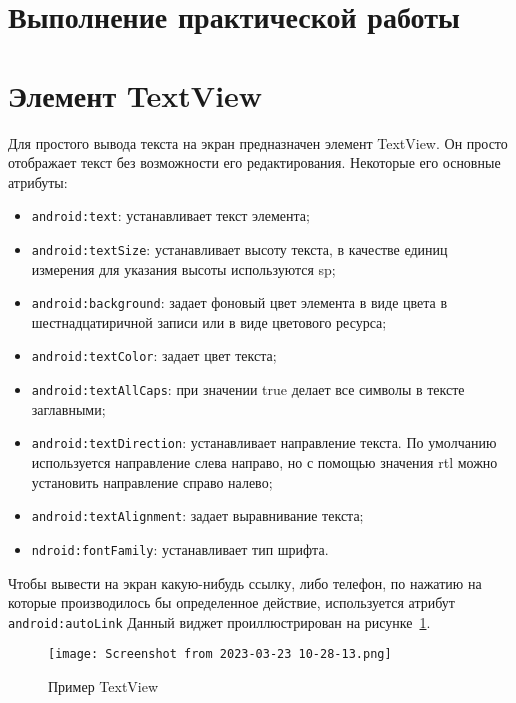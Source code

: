 \clearpage

\section*{\LARGE{Выполнение практической работы}}

\section{Элемент TextView}
Для простого вывода текста на экран предназначен элемент TextView. 
Он просто отображает текст без возможности его редактирования. 
Некоторые его основные атрибуты:

\begin{itemize}
	\item \texttt{android:text}: устанавливает текст элемента;
	\item \texttt{android:textSize}: устанавливает высоту текста,
		в качестве единиц измерения для указания высоты используются sp;
	\item \texttt{android:background}: задает фоновый цвет элемента в виде
		цвета в шестнадцатиричной записи или в виде цветового ресурса;
	\item \texttt{android:textColor}: задает цвет текста;
	\item \texttt{android:textAllCaps}: при значении true делает все символы
		в тексте заглавными;
	\item \texttt{android:textDirection}: устанавливает направление текста.
		По умолчанию используется направление слева направо, но с помощью
		значения rtl можно установить направление справо налево;
	\item \texttt{android:textAlignment}: задает выравнивание текста;
	\item \texttt{ndroid:fontFamily}: устанавливает тип шрифта.
\end{itemize}

Чтобы вывести на экран какую-нибудь ссылку, либо телефон,
по нажатию на которые производилось бы определенное действие,
используется атрибут \texttt{android:autoLink}
Данный виджет проиллюстрирован на рисунке~\ref{fig:textview}.

\begin{figure}[h!tp]
	\centering
	\texttt{[image: Screenshot from 2023-03-23 10-28-13.png]}
	\caption{Пример TextView}
	\label{fig:textview}
\end{figure}

